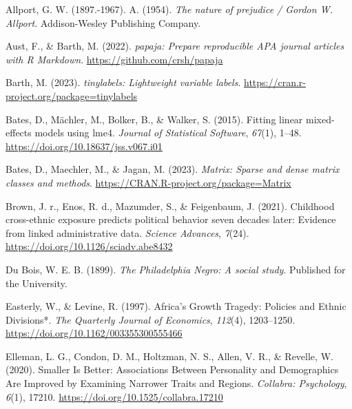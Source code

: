 \documentclass[
  man,floatsintext]{apa7}
\newlength{\cslhangindent}
\newlength{\cslentryspacingunit} %
\newenvironment{CSLReferences}[2] %
 {%
  \setlength{\parindent}{0pt}
  \ifodd #1
  \let\oldpar\par
  \def\par{\hangindent=\cslhangindent\oldpar}
  \fi
  \setlength{\parskip}{#2\cslentryspacingunit}
 }%
 {}
\begin{document}
\hypertarget{refs}{}
\begin{CSLReferences}{1}{0}
\leavevmode{}%
Allport, G. W. (1897.-1967). A. (1954). \emph{The nature of prejudice / {Gordon W}. {Allport}}. Addison-Wesley Publishing Company.

\leavevmode{}%
Aust, F., \& Barth, M. (2022). \emph{{papaja}: {Prepare} reproducible {APA} journal articles with {R Markdown}}. \url{https://github.com/crsh/papaja}

\leavevmode{}%
Barth, M. (2023). \emph{{tinylabels}: Lightweight variable labels}. \url{https://cran.r-project.org/package=tinylabels}

\leavevmode{}%
Bates, D., Mächler, M., Bolker, B., \& Walker, S. (2015). Fitting linear mixed-effects models using {lme4}. \emph{Journal of Statistical Software}, \emph{67}(1), 1--48. \url{https://doi.org/10.18637/jss.v067.i01}

\leavevmode{}%
Bates, D., Maechler, M., \& Jagan, M. (2023). \emph{Matrix: Sparse and dense matrix classes and methods}. \url{https://CRAN.R-project.org/package=Matrix}

\leavevmode{}%
Brown, J. r., Enos, R. d., Mazumder, S., \& Feigenbaum, J. (2021). Childhood cross-ethnic exposure predicts political behavior seven decades later: {Evidence} from linked administrative data. \emph{Science Advances}, \emph{7}(24). \url{https://doi.org/10.1126/sciadv.abe8432}

\leavevmode{}%
Du Bois, W. E. B. (1899). \emph{The {Philadelphia Negro}: {A} social study}. Published for the University.

\leavevmode{}%
Easterly, W., \& Levine, R. (1997). Africa's {Growth Tragedy}: {Policies} and {Ethnic Divisions}*. \emph{The Quarterly Journal of Economics}, \emph{112}(4), 1203--1250. \url{https://doi.org/10.1162/003355300555466}

\leavevmode{}%
Elleman, L. G., Condon, D. M., Holtzman, N. S., Allen, V. R., \& Revelle, W. (2020). Smaller {Is Better}: {Associations Between Personality} and {Demographics Are Improved} by {Examining Narrower Traits} and {Regions}. \emph{Collabra: Psychology}, \emph{6}(1), 17210. \url{https://doi.org/10.1525/collabra.17210}


\end{CSLReferences}
\end{document}
